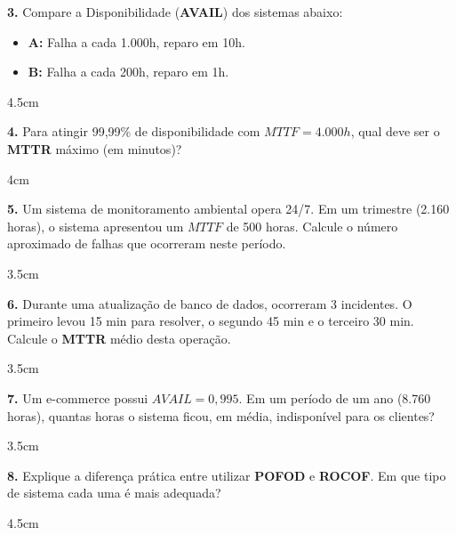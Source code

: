 \documentclass[12pt]{article}
\begin{document}
\vspace{0.4cm}

\textbf{3.} Compare a Disponibilidade (\textbf{AVAIL}) dos sistemas abaixo:
\begin{itemize}
    \item \textbf{A:} Falha a cada 1.000h, reparo em 10h.
    \item \textbf{B:} Falha a cada 200h, reparo em 1h.
\end{itemize}
\begin{resposta}{4.5cm}
\end{resposta}

\vspace{0.4cm}

\textbf{4.} Para atingir 99,99\% de disponibilidade com $MTTF = 4.000h$, qual deve ser o \textbf{MTTR} máximo (em minutos)?
\begin{resposta}{4cm}
\end{resposta}


\textbf{5.} Um sistema de monitoramento ambiental opera 24/7. Em um trimestre (2.160 horas), o sistema apresentou um $MTTF$ de 500 horas. Calcule o número aproximado de falhas que ocorreram neste período.
\begin{resposta}{3.5cm}
\end{resposta}

\vspace{0.5cm}

\textbf{6.} Durante uma atualização de banco de dados, ocorreram 3 incidentes. O primeiro levou 15 min para resolver, o segundo 45 min e o terceiro 30 min. Calcule o \textbf{MTTR} médio desta operação.
\begin{resposta}{3.5cm}
\end{resposta}

\vspace{0.5cm}

\textbf{7.} Um e-commerce possui $AVAIL = 0,995$. Em um período de um ano (8.760 horas), quantas horas o sistema ficou, em média, indisponível para os clientes?
\begin{resposta}{3.5cm}
\end{resposta}

\vspace{0.5cm}

\textbf{8.} Explique a diferença prática entre utilizar \textbf{POFOD} e \textbf{ROCOF}. Em que tipo de sistema cada uma é mais adequada?
\begin{resposta}{4.5cm}
\end{resposta}
\end{document}
